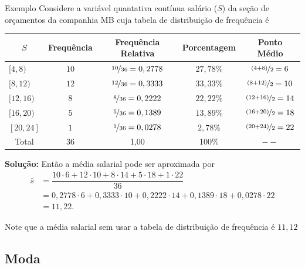 \documentclass[8pt]{beamer}
\begin{document}
\begin{frame}{Exemplo}
 Considere a variável quantativa contínua salário ($S$) da seção de orçamentos da companhia MB cuja tabela de distribuição de frequência é 
 
 {\tiny
  \begin{table}
   \centering
   \begin{tabular}{l|ccc|c}
    \toprule[0.05cm]
   \multicolumn{1}{c|}{$S$} & Frequência & Frequência Relativa & Porcentagem & Ponto Médio \\ \midrule[0.05cm]
    $[4, 8)$ & $10$ & $\nicefrac{10}{36}=0,2778$ & $27,78 \%$ & $\nicefrac{(4+8)}{2} = 6$ \\
    $[8, 12)$ & $12$ & $\nicefrac{12}{36}=0,3333$ & $33,33 \%$ & $\nicefrac{(8+12)}{2} = 10$\\
    $[12, 16)$ & $8$ & $\nicefrac{8}{36}=0,2222$ & $22,22 \%$ &  $\nicefrac{(12+16)}{2} = 14$\\
    $[16, 20)$ & $5$ & $\nicefrac{5}{36}=0,1389$ & $13,89 \%$ & $\nicefrac{(16+20)}{2} = 18$\\
    $[20, 24]$ & $1$ & $\nicefrac{1}{36}=0,0278$ & $2,78 \%$ & $\nicefrac{(20+24)}{2} = 22$\\ \midrule[0.05cm]
   \multicolumn{1}{c|}{Total} & 36 & 1,00 & 100\% & $--$ \\ \bottomrule[0.05cm]
   \end{tabular}
  \end{table}
 }
 
 \textbf{Solução:} Então a média salarial pode ser {\color{red} aproximada} por
 \begin{align*}
  \bar{s} &= \dfrac{10\cdot 6 + 12 \cdot 10 + 8 \cdot 14 + 5 \cdot 18 + 1 \cdot 22}{36}\\
  &= 0,2778 \cdot 6 + 0,3333 \cdot 10 + 0,2222 \cdot 14 + 0,1389 \cdot 18 + 0,0278 \cdot 22\\
  &= 11,22.
 \end{align*}

 {\color{blue} Note que a média salarial sem usar a tabela de distribuição de frequência é $11,12$}
\end{frame}

\subsection{Moda}
\end{document}
